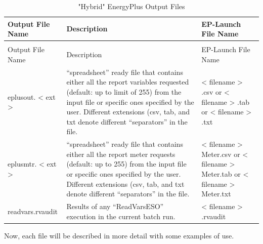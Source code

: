 \begin{longtable}[c]{p{1.5in}p{3.0in}p{1.5in}}
\caption{"Hybrid" EnergyPlus Output Files \label{table:hybrid-energyplus-output-files}} \tabularnewline
\toprule
Output File Name & Description & EP-Launch File Name \tabularnewline
\midrule
\endfirsthead

\caption[]{"Hybrid" EnergyPlus Output Files} \tabularnewline
\toprule
Output File Name & Description & EP-Launch File Name \tabularnewline
\midrule
\endhead

eplusout. < ext >  ~ & “spreadsheet” ready file that contains either all the report variables requested (default: up to limit of 255) from the input file or specific ones specified by the user. Different extensions (csv, tab, and txt denote different “separators” in the file. & < filename > .csv or  < filename > .tab or  < filename > .txt \tabularnewline
eplusmtr. < ext >  ~ & “spreadsheet” ready file that contains either all the report meter requests (default: up to 255) from the input file or specific ones specified by the user. Different extensions (csv, tab, and txt denote different “separators” in the file. & < filename > Meter.csv or  < filename > Meter.tab or  < filename > Meter.txt \tabularnewline
readvars.rvaudit & Results of any “ReadVarsESO” execution in the current batch run. & < filename > .rvaudit \tabularnewline
\bottomrule
\end{longtable}

Now, each file will be described in more detail with some examples of use.
